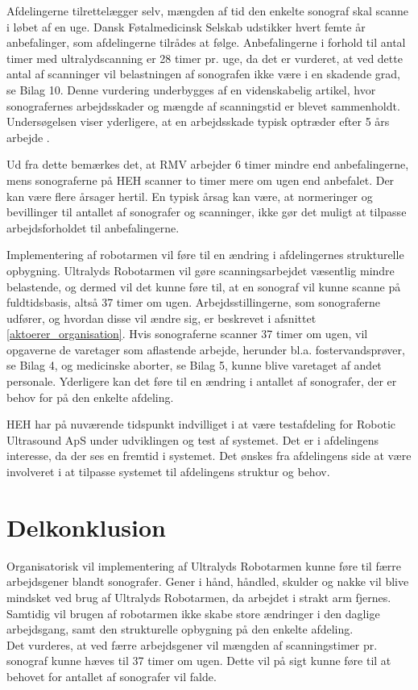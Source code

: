 Afdelingerne tilrettelægger selv, mængden af tid den enkelte sonograf skal scanne i løbet af en uge. Dansk Føtalmedicinsk Selskab udstikker hvert femte år anbefalinger, som afdelingerne tilrådes at følge. Anbefalingerne i forhold til antal timer med ultralydscanning er 28 timer pr. uge, da det er vurderet, at ved dette antal af scanninger vil belastningen af sonografen ikke være i en skadende grad, se Bilag 10. Denne vurdering underbygges af en videnskabelig artikel, hvor sonografernes arbejdsskader og mængde af scanningstid er blevet sammenholdt. Undersøgelsen viser yderligere, at en arbejdsskade typisk optræder efter 5 års arbejde \cite{35}.

Ud fra dette bemærkes det, at RMV arbejder 6 timer mindre end anbefalingerne, mens sonograferne på HEH scanner to timer mere om ugen end anbefalet. Der kan være flere årsager hertil. En typisk årsag kan være, at normeringer og bevillinger til antallet af sonografer og scanninger, ikke gør det muligt at tilpasse arbejdsforholdet til anbefalingerne. 

Implementering af robotarmen vil føre til en ændring i afdelingernes strukturelle opbygning. Ultralyds Robotarmen vil gøre scanningsarbejdet væsentlig mindre belastende, og dermed vil det kunne føre til, at en sonograf vil kunne scanne på fuldtidsbasis, altså 37 timer om ugen. Arbejdsstillingerne, som sonograferne udfører, og hvordan disse vil ændre sig, er beskrevet i afsnittet \ref{aktoerer_organisation}. Hvis sonograferne scanner 37 timer om ugen, vil opgaverne de varetager som aflastende arbejde, herunder bl.a. fostervandsprøver, se Bilag 4, og medicinske aborter, se Bilag 5, kunne blive varetaget af andet personale. Yderligere kan det føre til en ændring i antallet af sonografer, der er behov for på den enkelte afdeling. 

HEH har på nuværende tidspunkt indvilliget i at være testafdeling for Robotic Ultrasound ApS under udviklingen og test af systemet. Det er i afdelingens interesse, da der ses en fremtid i systemet. Det ønskes fra afdelingens side at være involveret i at tilpasse systemet til afdelingens struktur og behov. 

\section{Delkonklusion}
Organisatorisk vil implementering af Ultralyds Robotarmen kunne føre til færre arbejdsgener blandt sonografer. Gener i hånd, håndled, skulder og nakke vil blive mindsket ved brug af Ultralyds Robotarmen, da arbejdet i strakt arm fjernes.\\ Samtidig vil brugen af robotarmen ikke skabe store ændringer i den daglige arbejdsgang, samt den strukturelle opbygning på den enkelte afdeling. \\
Det vurderes, at ved færre arbejdsgener vil mængden af scanningstimer pr. sonograf kunne hæves til 37 timer om ugen. Dette vil på sigt kunne føre til at behovet for antallet af sonografer vil falde.

